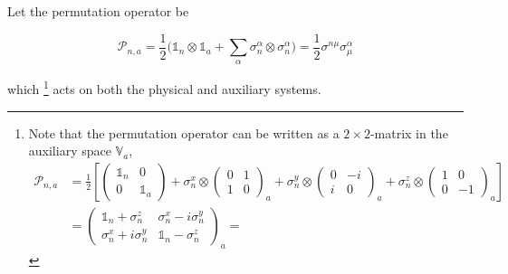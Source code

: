 \documentclass{homework}
\begin{document}
\begin{df}
    Let the permutation operator be
    
    \begin{equation}
        \bm{\mathcal P}_{n,a} = \frac{1}{2} \bigg(\mathds{1}_n \otimes \mathds{1}_a + \sum_{\alpha}\sigma_n^{\alpha}  \otimes \sigma_n^{\alpha} \bigg) = \frac{1}{2} \sigma^{n \mu}\sigma^{\alpha}_{\mu}
        \label{permutation op}
    \end{equation}
    
    which \footnote{Note that the permutation operator can be written as a $2 \times 2$-matrix in the auxiliary space $\mathds{V}_a$,
\begin{equation} 
\begin{split}
    \bm{\mathcal P}_{n,a} &= \frac{1}{2} \left[ \left(\begin{array}{cc}
        \mathds{1}_n & 0  \\
        0 & \mathds{1}_a 
    \end{array}\right) + \sigma^{x}_{n} \otimes \left(\begin{array}{cc}
        0 & 1 \\
        1 & 0
    \end{array}\right)_a + \sigma^{y}_{n} \otimes \left(\begin{array}{cc}
        0 & -i \\
        i & 0 
    \end{array}\right)_a + \sigma^{z}_{n} \otimes \left(\begin{array}{cc}
        1 & 0  \\
        0 & -1
    \end{array}\right)_a \right] \\
    &= \left(\begin{array}{cc}
       \mathds{1}_n + \sigma^{z}_{n} &  \sigma^{x}_{n} - i\sigma^{y}_{n} \\
       \sigma^{x}_{n} + i\sigma^{y}_{n}  & \mathds{1}_n - \sigma^{z}_{n}
    \end{array}\right)_a = 
    \end{split}
\end{equation}} acts on both the physical and auxiliary systems.
\end{df}
\end{document}
